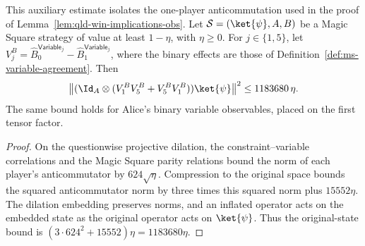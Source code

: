 \begin{lemma}
	\label{lem:qld-ms-anticommutator-original-state}
	\leanok
	This auxiliary estimate isolates the one-player anticommutation used in
	the proof of Lemma~\ref{lem:qld-win-implications-obs}.
	Let $\mathcal S=(\ket{\psi},A,B)$ be a Magic Square strategy of value
	at least $1-\eta$, with $\eta\geq0$. For $j\in\{1,5\}$, let
	$V_j^B=\hat B^{\mathsf{Variable}_j}_0-\hat B^{\mathsf{Variable}_j}_1$,
	where the binary effects are those of
	Definition~\ref{def:ms-variable-agreement}. Then
	\[
	\big\|(\Id_A\otimes(V_1^B V_5^B+V_5^B V_1^B))\ket{\psi}\big\|^2
	\leq 1183680\,\eta.
	\]
	The same bound holds for Alice's binary variable observables, placed
	on the first tensor factor.
\end{lemma}
\begin{proof}
	\leanok
	On the questionwise projective dilation, the constraint--variable
	correlations and the Magic Square parity relations bound the norm of
	each player's anticommutator by $624\sqrt\eta$. Compression to the
	original space bounds the squared anticommutator norm by three times
	this squared norm plus $15552\eta$.
	The dilation embedding preserves norms, and an inflated operator acts
	on the embedded state as the original operator acts on $\ket{\psi}$.
	Thus the original-state bound is
	$(3\cdot624^2+15552)\eta=1183680\eta$.
\end{proof}

